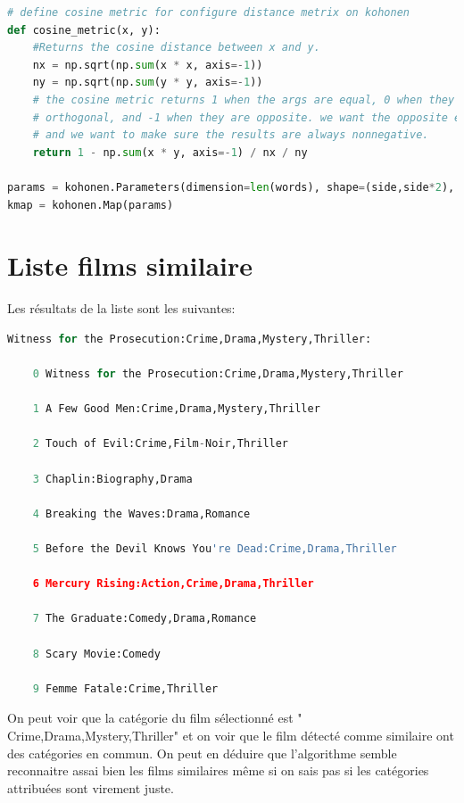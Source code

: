 		\begin{lstlisting}[language=python]
# define cosine metric for configure distance metrix on kohonen
def cosine_metric(x, y):
	#Returns the cosine distance between x and y.
	nx = np.sqrt(np.sum(x * x, axis=-1))
	ny = np.sqrt(np.sum(y * y, axis=-1))
	# the cosine metric returns 1 when the args are equal, 0 when they are
	# orthogonal, and -1 when they are opposite. we want the opposite effect,
	# and we want to make sure the results are always nonnegative.
	return 1 - np.sum(x * y, axis=-1) / nx / ny

params = kohonen.Parameters(dimension=len(words), shape=(side,side*2), metric=cosine_metric)
kmap = kohonen.Map(params)
		\end{lstlisting}

	
	\section{Liste films similaire}
	Les résultats de la liste sont les suivantes:
		\begin{lstlisting}[language=python]
Witness for the Prosecution:Crime,Drama,Mystery,Thriller:

	0 Witness for the Prosecution:Crime,Drama,Mystery,Thriller

	1 A Few Good Men:Crime,Drama,Mystery,Thriller

	2 Touch of Evil:Crime,Film-Noir,Thriller

	3 Chaplin:Biography,Drama

	4 Breaking the Waves:Drama,Romance

	5 Before the Devil Knows You're Dead:Crime,Drama,Thriller

	6 Mercury Rising:Action,Crime,Drama,Thriller

	7 The Graduate:Comedy,Drama,Romance

	8 Scary Movie:Comedy

	9 Femme Fatale:Crime,Thriller
		\end{lstlisting}
		
		On peut voir que la catégorie du film sélectionné est "	Crime,Drama,Mystery,Thriller" et on voir que le film détecté comme similaire ont des catégories en commun. On peut en déduire que l'algorithme semble reconnaitre assai bien les films similaires même si on sais pas si les catégories attribuées sont virement juste. 
	
	
